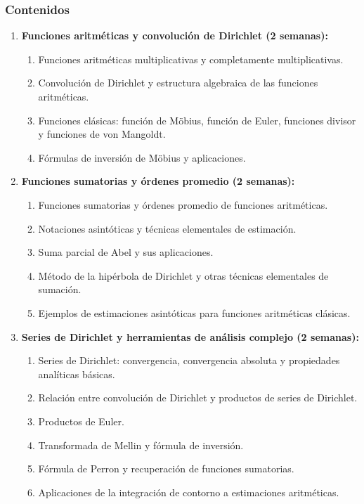 \begin{refsection}
\subsubsection*{Contenidos}

\begin{enumerate}

\item \textbf{Funciones aritméticas y convolución de Dirichlet (2 semanas):}
\begin{enumerate}
\item Funciones aritméticas multiplicativas y completamente multiplicativas.
\item Convolución de Dirichlet y estructura algebraica de las funciones aritméticas.
\item Funciones clásicas: función de M\"obius, función de Euler, funciones divisor y funciones de von Mangoldt.
\item Fórmulas de inversión de M\"obius y aplicaciones.
\end{enumerate}

\item \textbf{Funciones sumatorias y órdenes promedio (2 semanas):}
\begin{enumerate}
\item Funciones sumatorias y órdenes promedio de funciones aritméticas.
\item Notaciones asintóticas y técnicas elementales de estimación.
\item Suma parcial de Abel y sus aplicaciones.
\item Método de la hipérbola de Dirichlet y otras técnicas elementales de sumación.
\item Ejemplos de estimaciones asintóticas para funciones aritméticas clásicas.
\end{enumerate}

\item \textbf{Series de Dirichlet y herramientas de análisis complejo (2 semanas):}
\begin{enumerate}
\item Series de Dirichlet: convergencia, convergencia absoluta y propiedades analíticas básicas.
\item Relación entre convolución de Dirichlet y productos de series de Dirichlet.
\item Productos de Euler.
\item Transformada de Mellin y fórmula de inversión.
\item Fórmula de Perron y recuperación de funciones sumatorias.
\item Aplicaciones de la integración de contorno a estimaciones aritméticas.
\end{enumerate}


\end{enumerate}
\end{refsection}
